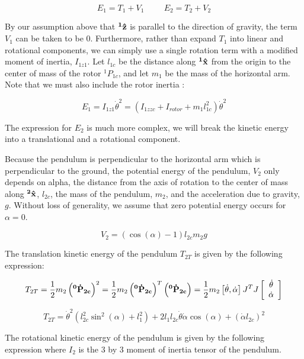 \documentclass{article}
\theoremstyle{plain}
\theoremstyle{definition}
\theoremstyle{remark}
\begin{document}
$$ E_{1} = T_{1} + V_{1} \hspace{1cm} E_{2} = T_{2} + V_{2} $$

By our assumption above that $\bf{^1\hat{z}}$ is parallel to the direction of gravity, the term $V_{1}$ can be taken to be 0.  Furthermore, rather than expand $T_{1}$ into linear and rotational components, we can simply use a single rotation term with a modified moment of inertia, $I_{1z1}$.  Let $l_{1c}$ be the distance along $\bf{^1\hat{x}}$ from the origin to the center of mass of the rotor $^1P_{1c}$, and let $m_{1}$ be the mass of the horizontal arm.  Note that we must also include the rotor inertia :

$$ E_{1} = I_{1z1} \dot{\theta}^2 = \left( I_{1zzc} + I_{rotor} + m_{1} l_{1c}^2 \right) \dot{\theta}^2$$

The expression for $E_{2}$ is much more complex, we will break the kinetic energy into a translational and a rotational component. 

Because the pendulum is perpendicular to the horizontal arm which is perpendicular to the ground, the potential energy of the pendulum, $V_{2}$ only depends on alpha, the distance from the axis of rotation to the center of mass along $\bf{^2\hat{x}}$, $l_{2c}$, the mass of the pendulum, $m_{2}$, and the acceleration due to gravity, $g$.  Without loss of generality, we assume that zero potential energy occurs for $\alpha = 0$.

$$ V_{2} = \left( \cos(\alpha) - 1 \right) l_{2c} m_2 g $$

The translation kinetic energy of the pendulum $T_{2T}$ is given by the following expression: 

$$ T_{2T} = \frac{1}{2} m_{2} \left( \bf{^0\dot{P}_{2c}} \right)^2 = \frac{1}{2} m_{2} \left( \bf{^0\dot{P}_{2c}} \right)^T\left( \bf{^0\dot{P}_{2c}} \right) = \frac{1}{2} m_{2} \left[ \dot{\theta}, \dot{\alpha} \right] J^T J \left[ \begin{array}{c l} \dot{\theta} \\ \dot{\alpha} \end{array} \right] $$

$$ T_{2T} = \dot{\theta}^2 \left( l_{2c}^2  \sin^2(\alpha)  + l_{1}^2 \right) + 2 l_{1} l_{2c} \dot{\theta} \dot{\alpha} \cos(\alpha) + \left( \dot{\alpha} l_{2c} \right)^2 $$

The rotational kinetic energy of the pendulum is given by the following expression where $I_{2}$ is the 3 by 3 moment of inertia tensor of the pendulum. 
\end{document}

